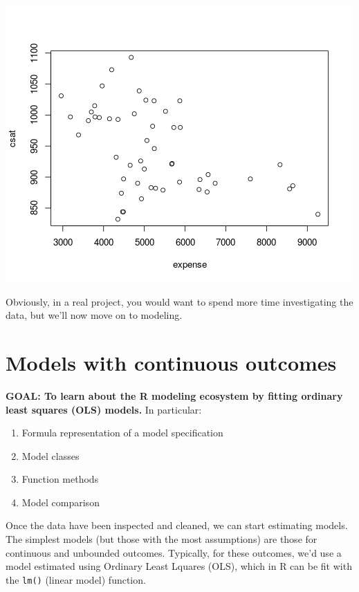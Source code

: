\documentclass[
]{book}
\providecommand{\tightlist}{%
  \setlength{\itemsep}{0pt}\setlength{\parskip}{0pt}}
\begin{document}
\includegraphics{R/Rmodels/images/statesCorr1.png}

Obviously, in a real project, you would want to spend more time investigating the data,
but we'll now move on to modeling.

\hypertarget{models-with-continuous-outcomes}{%
\section{Models with continuous outcomes}\label{models-with-continuous-outcomes}}

\textbf{GOAL: To learn about the R modeling ecosystem by fitting ordinary least squares (OLS) models.} In particular:

\begin{enumerate}
\def\labelenumi{\arabic{enumi}.}
\tightlist
\item
  Formula representation of a model specification
\item
  Model classes
\item
  Function methods
\item
  Model comparison
\end{enumerate}

Once the data have been inspected and cleaned, we can start estimating models.
The simplest models (but those with the most assumptions) are those for continuous and unbounded outcomes.
Typically, for these outcomes, we'd use a model estimated using Ordinary Least Lquares (OLS),
which in R can be fit with the \texttt{lm()} (linear model) function.
\end{document}
